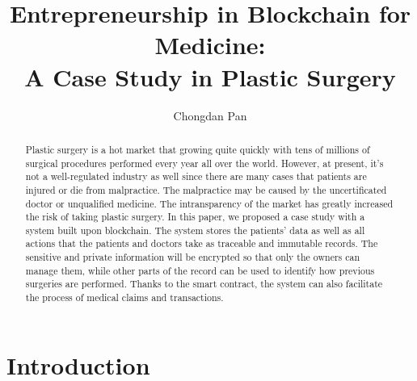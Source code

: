 \documentclass{article}
\title{Entrepreneurship in Blockchain for Medicine: \\A Case Study in Plastic Surgery}
\author{Chongdan Pan}
\begin{document}
\maketitle

\begin{abstract}
Plastic surgery is a hot market that growing quite quickly with tens of millions of surgical procedures performed every year all over the world. However, at present, it's not a well-regulated industry as well since there are many cases that patients are injured or die from malpractice. The malpractice may be caused by the uncertificated doctor or unqualified medicine. The intransparency of the market has greatly increased the risk of taking plastic surgery. In this paper, we proposed a case study with a system built upon blockchain. The system stores the patients' data as well as all actions that the patients and doctors take as traceable and immutable records. The sensitive and private information will be encrypted so that only the owners can manage them, while other parts of the record can be used to identify how previous surgeries are performed. Thanks to the smart contract, the system can also facilitate the process of medical claims and transactions.
\end{abstract}
\section{Introduction}
\end{document}
